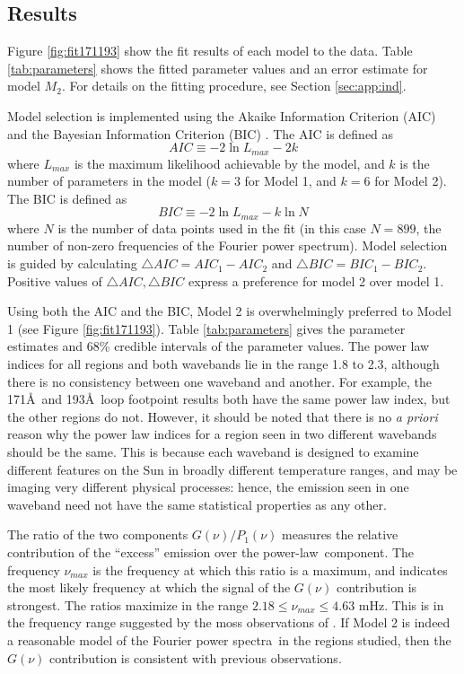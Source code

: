 \documentclass[onecolumn]{emulateapj}
\newcommand{\PA}{power spectra}
\newcommand{\PL}{power-law}
\newcommand{\Fpa}{Fourier \PA}
\begin{document}
\subsection{Results}\label{ssec:results}
Figure \ref{fig:fit171193} show the fit results of each model to the
data.  Table \ref{tab:parameters} shows the fitted parameter values
and an error estimate for model $M_{2}$.  For details on the fitting
procedure, see Section \ref{sec:app:ind}.

Model selection is implemented using the Akaike Information Criterion
(AIC) and the Bayesian Information Criterion (BIC)
\citep{2007MNRAS.377L..74L, WICS:WICS199}.  The AIC is defined as
\begin{equation}\label{eqn:aic}
AIC \equiv -2 \ln L_{max} - 2k
\end{equation}
where $L_{max}$ is the maximum likelihood achievable by the model, and
$k$ is the number of parameters in the model ($k=3$ for Model 1, and
$k=6$ for Model 2).  The BIC is defined as
\begin{equation}\label{eqn:bic}
BIC \equiv -2 \ln L_{max} - k\ln N
\end{equation}
where $N$ is the number of data points used in the fit (in this case
$N=899$, the number of non-zero frequencies of the Fourier power
spectrum).  Model selection is guided by calculating $\triangle AIC =
AIC_{1} - AIC_{2}$ and $\triangle BIC = BIC_{1} - BIC_{2}$.  Positive
values of $\triangle AIC, \triangle BIC$ express a preference for model 2
over model 1.

Using both the AIC and the BIC, Model 2 is overwhelmingly preferred to
Model 1 (see Figure \ref{fig:fit171193}). Table \ref{tab:parameters}
gives the parameter estimates and 68\% credible intervals of the
parameter values.  The power law indices for all regions and both
wavebands lie in the range 1.8 to 2.3, although there is no
consistency between one waveband and another.  For example, the
171\AA\ and 193\AA\ loop footpoint results both have the same power
law index, but the other regions do not.  However, it should be noted
that there is no {\it a priori} reason why the power law indices for a
region seen in two different wavebands should be the same.  This is
because each waveband is designed to examine different features on the
Sun in broadly different temperature ranges, and may be imaging very
different physical processes: hence, the emission seen in one waveband
need not have the same statistical properties as any other.

The ratio of the two components $G(\nu)/P_{1}(\nu)$ measures the
relative contribution of the ``excess'' emission over the
\PL\ component.  The frequency $\nu_{max}$ is the frequency at which
this ratio is a maximum, and indicates the most likely frequency at
which the signal of the $G(\nu)$ contribution is strongest.  The
ratios maximize in the range $2.18 \le \nu_{max} \le 4.63$ mHz.  This
is in the frequency range suggested by the moss observations of
\cite{2003ApJ...595L..63D}.  If Model 2 is indeed a reasonable model
of the \Fpa\ in the regions studied, then the $G(\nu)$ contribution is
consistent with previous observations.
\end{document}
